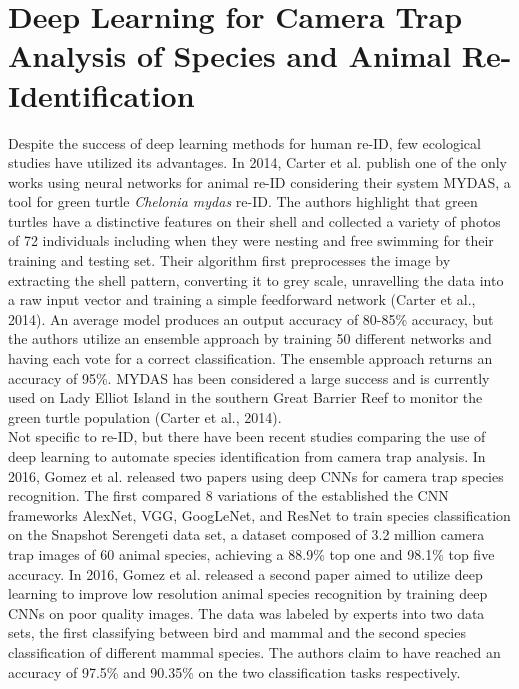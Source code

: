 \documentclass[11pt]{article}
\begin{document}
\section*{Deep Learning for Camera Trap Analysis of Species and Animal Re-Identification}

Despite the success of deep learning methods for human re-ID, few ecological studies have utilized its advantages. In 2014, Carter et al. publish one of the only works using neural networks for animal re-ID considering their system MYDAS, a tool for green turtle \textit{Chelonia mydas} re-ID. The authors highlight that green turtles have a distinctive features on their shell and collected a variety of photos of 72 individuals including when they were nesting and free swimming for their training and testing set. Their algorithm first preprocesses the image by extracting the shell pattern, converting it to grey scale, unravelling the data into a raw input vector and training a simple feedforward network (Carter et al., 2014). An average model produces an output accuracy of 80-85\% accuracy, but the authors utilize an ensemble approach by training 50 different networks and having each vote for a correct classification. The ensemble approach returns an accuracy of 95\%. MYDAS has been considered a large success and is currently used on Lady Elliot Island in the southern Great Barrier Reef to monitor the green turtle population (Carter et al., 2014).
\newline
\\
Not specific to re-ID, but there have been recent studies comparing the use of deep learning to automate species identification from camera trap analysis. In 2016, Gomez et al. released two papers using deep CNNs for camera trap species recognition. The first compared 8 variations of the established the CNN frameworks AlexNet, VGG, GoogLeNet, and ResNet to train species classification on the Snapshot Serengeti data set, a dataset composed of 3.2 million camera trap images of 60 animal species, achieving a 88.9\% top one and 98.1\% top five accuracy. In 2016, Gomez et al. released a second paper aimed to utilize deep learning to improve low resolution animal species recognition by training deep CNNs on poor quality images. The data was labeled by experts into two data sets, the first classifying between bird and mammal and the second species classification of different mammal species. The authors claim to have reached an accuracy of 97.5\% and 90.35\% on the two classification tasks respectively.
\newline
\end{document}
